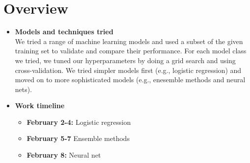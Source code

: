 \section{Overview}
\medskip
\begin{itemize}
  
\item \textbf{Models and techniques tried}\\
  
  We tried a range of machine learning models and used a subset of the given training set to validate and compare their performance. For each model class we tried, we tuned our hyperparameters by doing a grid search and using cross-validation. We tried simpler models first (e.g., logistic regression) and moved on to more sophisticated models (e.g., enesemble methods and neural nets).
  
\item \textbf{Work timeline}
  \begin{itemize}
  \item \textbf{February 2-4:} Logistic regression
  \item \textbf{February 5-7} Ensemble methods 
  \item \textbf{February 8:} Neural net
  \end{itemize}
  
\end{itemize}



